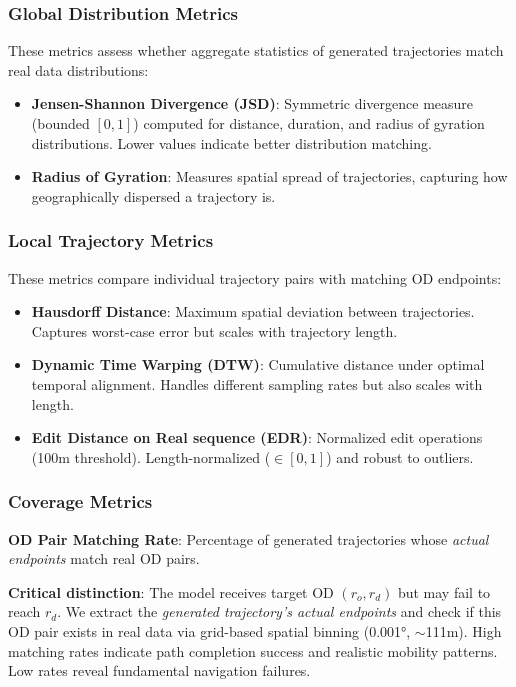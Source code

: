 \subsubsection{Global Distribution Metrics}

These metrics assess whether aggregate statistics of generated trajectories match real data distributions:

\begin{itemize}[noitemsep,topsep=0pt]
    \item \textbf{Jensen-Shannon Divergence (JSD)}: Symmetric divergence measure (bounded $[0, 1]$) computed for distance, duration, and radius of gyration distributions. Lower values indicate better distribution matching.
    \item \textbf{Radius of Gyration}: Measures spatial spread of trajectories, capturing how geographically dispersed a trajectory is.
\end{itemize}

\subsubsection{Local Trajectory Metrics}

These metrics compare individual trajectory pairs with matching OD endpoints:

\begin{itemize}[noitemsep,topsep=0pt]
    \item \textbf{Hausdorff Distance}: Maximum spatial deviation between trajectories. Captures worst-case error but scales with trajectory length.
    \item \textbf{Dynamic Time Warping (DTW)}: Cumulative distance under optimal temporal alignment. Handles different sampling rates but also scales with length.
    \item \textbf{Edit Distance on Real sequence (EDR)}: Normalized edit operations (100m threshold). Length-normalized ($\in [0,1]$) and robust to outliers.
\end{itemize}

\subsubsection{Coverage Metrics}

\textbf{OD Pair Matching Rate}: Percentage of generated trajectories whose \emph{actual endpoints} match real OD pairs.

\textbf{Critical distinction}: The model receives target OD $(r_o, r_d)$ but may fail to reach $r_d$. We extract the \emph{generated trajectory's actual endpoints} and check if this OD pair exists in real data via grid-based spatial binning (0.001°, $\sim$111m). High matching rates indicate path completion success and realistic mobility patterns. Low rates reveal fundamental navigation failures.

